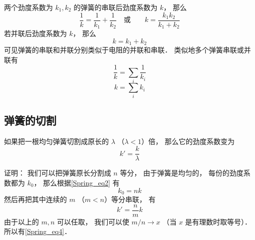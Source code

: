 
\begin{issues}
\issueDraft
\end{issues}


两个劲度系数为 $k_1, k_2$ 的弹簧的串联后劲度系数为 $k$， 那么
\begin{equation}
\frac{1}{k} = \frac{1}{k_1} + \frac{1}{k_2}
\quad \text{或} \qquad
k = \frac{k_1 k_2}{k_1 + k_2}
\end{equation}
若并联后劲度系数为 $k$， 那么
\begin{equation}
k = k_1 + k_2
\end{equation}
可见弹簧的串联和并联分别类似于电阻的并联和串联． 类似地多个弹簧串联或并联有
\begin{equation}\label{Spring_eq2}
\frac{1}{k} = \sum_i \frac{1}{k_i}
\end{equation}
\begin{equation}\label{Spring_eq3}
k = \sum_i k_i
\end{equation}


\subsection{弹簧的切割}
如果把一根均匀弹簧切割成原长的 $\lambda$ （$\lambda < 1$）倍， 那么它的劲度系数变为
\begin{equation}\label{Spring_eq4}
k' = \frac{k}{\lambda}
\end{equation}

证明： 我们可以把弹簧原长分割成 $n$ 等分， 由于弹簧是均匀的， 每份的劲度系数都为 $k_0$， 那么根据\autoref{Spring_eq2} 有
\begin{equation}
k_0 = nk
\end{equation}
然后再把其中连续的 $m$ （$m < n$）等分串联， 有
\begin{equation}
k' = \frac{n}{m}k
\end{equation}
由于以上的 $m, n$ 可以任取， 我们可以使 $m/n \to x$ （当 $x$ 是有理数时取等号）．所以有\autoref{Spring_eq4}．

